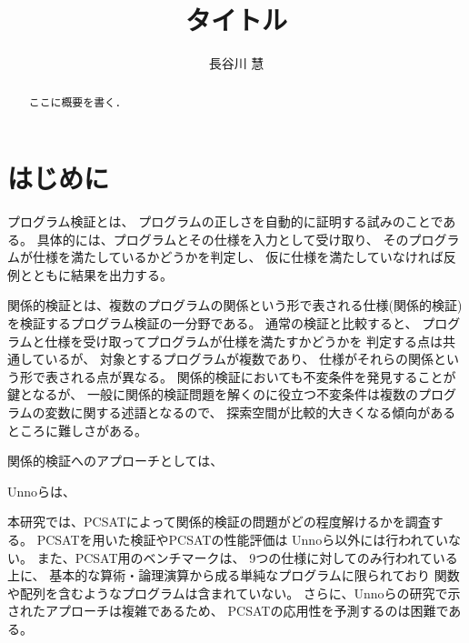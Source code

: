 \documentclass[uplatex]{suribt}
\title{タイトル}
\author{長谷川 慧}
\begin{document}
\maketitle%

\frontmatter%
\begin{abstract}%
 ここに概要を書く．
\end{abstract}

\tableofcontents%

\mainmatter%
\chapter{はじめに}
プログラム検証とは、
プログラムの正しさを自動的に証明する試みのことである。
具体的には、プログラムとその仕様を入力として受け取り、
そのプログラムが仕様を満たしているかどうかを判定し、
仮に仕様を満たしていなければ反例とともに結果を出力する。


関係的検証とは、複数のプログラムの関係という形で表される仕様(関係的検証)
を検証するプログラム検証の一分野である。
通常の検証と比較すると、
プログラムと仕様を受け取ってプログラムが仕様を満たすかどうかを
判定する点は共通しているが、
対象とするプログラムが複数であり、
仕様がそれらの関係という形で表される点が異なる。%
関係的検証においても不変条件を発見することが鍵となるが、%
一般に関係的検証問題を解くのに役立つ不変条件は複数のプログラムの変数に関する述語となるので、
探索空間が比較的大きくなる傾向があるところに難しさがある。%

関係的検証へのアプローチとしては、

Unnoらは、

本研究では、PCSATによって関係的検証の問題がどの程度解けるかを調査する。
PCSATを用いた検証やPCSATの性能評価は
Unnoら以外には行われていない。
また、PCSAT用のベンチマークは、
9つの仕様に対してのみ行われている上に、
基本的な算術・論理演算から成る単純なプログラムに限られており
関数や配列を含むようなプログラムは含まれていない。
さらに、Unnoらの研究で示されたアプローチは複雑であるため、
PCSATの応用性を予測するのは困難である。
\end{document}
